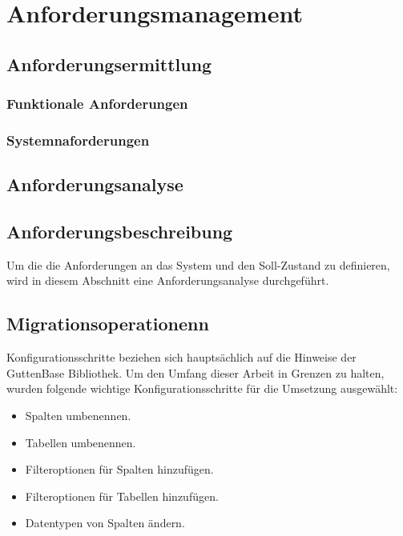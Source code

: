 \chapter{Anforderungsmanagement}
\section{Anforderungsermittlung}
\subsection{Funktionale Anforderungen}
\subsection{Systemnaforderungen}
\section{Anforderungsanalyse}
\section{Anforderungsbeschreibung}

Um die die Anforderungen an das System und den Soll-Zustand zu definieren, wird in diesem Abschnitt eine Anforderungsanalyse durchgeführt. 

\section{Migrationsoperationenn}
Konfigurationsschritte beziehen sich hauptsächlich auf die Hinweise der GuttenBase Bibliothek. Um den Umfang dieser Arbeit in Grenzen zu halten, wurden folgende wichtige Konfigurationsschritte für die Umsetzung ausgewählt:

\begin{itemize}
	\item Spalten  umbenennen.
	\item Tabellen umbenennen.
	\item Filteroptionen für Spalten hinzufügen.
	\item Filteroptionen für Tabellen hinzufügen.
	\item Datentypen von Spalten ändern.
\end{itemize}

